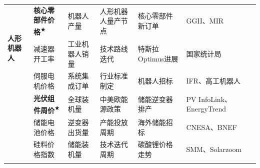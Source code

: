 \begin{table}[htbp]
\begin{tabular}{@{}ll>{\raggedright\arraybackslash}p{2.6cm}>{\raggedright\arraybackslash}p{2.6cm}>{\raggedright\arraybackslash}p{2.6cm}>{\raggedright\arraybackslash}p{2.6cm}l@{}}
    \multirow{3}{*}{\textbf{人形机器人}}
      & \textbf{核心零部件价格}\textsuperscript{★} & 机器人产量 & 人形机器人量产节点 & 核心零部件新订单 & GGII、MIR \\
      & 减速器开工率 & 工业机器人销量 & 技术路线迭代 & 特斯拉Optimus进展 & 国家统计局 \\
      & 伺服电机价格 & 系统集成订单 & 行业标准制定 & 机器人招标 & IFR、高工机器人 \\
    \addlinespace

    \multirow{3}{*}{\textbf{光伏储能}}
      & \textbf{光伏组件周价}\textsuperscript{★} & 全球装机量 & 中美欧能源政策 & 储能逆变器排产 & PV InfoLink、EnergyTrend \\
      & 储能电池价格 & 逆变器出货量 & 产能投放周期 & 海外储能招标 &  CNESA、BNEF \\
      & 硅料价格指数 & 储能装机量 & 技术迭代周期 & 碳酸锂价格走势 & SMM、Solarzoom \\
    \addlinespace


\end{tabular}
\end{table}
